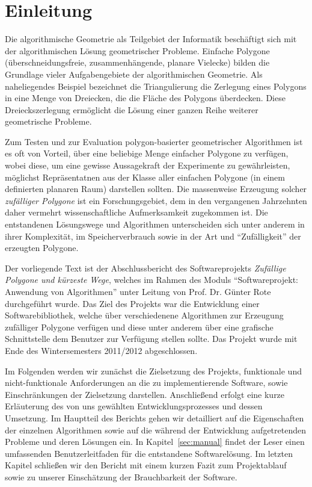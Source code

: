 \section{Einleitung}

  Die algorithmische Geometrie als Teilgebiet der Informatik beschäftigt sich
  mit der algorithmischen Lösung geometrischer Probleme. Einfache Polygone
  (überschneidungsfreie, zusammenhängende, planare Vielecke) bilden die
  Grundlage vieler Aufgabengebiete der algorithmischen Geometrie. Als
  naheliegendes Beispiel bezeichnet die Triangulierung die Zerlegung eines
  Polygons in eine Menge von Dreiecken, die die Fläche des Polygons
  überdecken. Diese Dreieckszerlegung ermöglicht die Lösung einer ganzen Reihe
  weiterer geometrische Probleme.

  Zum Testen und zur Evaluation polygon-basierter geometrischer
  Algorithmen ist es oft von Vorteil, über eine beliebige Menge einfacher
  Polygone zu verfügen, wobei diese, um eine gewisse Aussagekraft der
  Experimente zu gewährleisten, möglichst Repräsentatnen aus der Klasse aller
  einfachen Polygone (in einem definierten planaren Raum) darstellen sollten. 
  Die massenweise Erzeugung solcher \emph{zufälliger Polygone} ist ein
  Forschungsgebiet, dem in den vergangenen Jahrzehnten daher vermehrt
  wissenschaftliche Aufmerksamkeit zugekommen ist. Die entstandenen
  Lösungswege und Algorithmen unterscheiden sich unter anderem in ihrer
  Komplexität, im Speicherverbrauch sowie in der Art und
  \enquote{Zufälligkeit} der erzeugten Polygone.

  Der vorliegende Text ist der Abschlussbericht des Softwareprojekts
  \emph{Zufällige Polygone und kürzeste Wege}, welches im Rahmen des Moduls
  \enquote{Softwareprojekt: Anwendung von Algorithmen} unter Leitung von Prof.
  Dr. Günter Rote durchgeführt wurde. Das Ziel des Projekts war die
  Entwicklung einer Softwarebibliothek, welche über verschiedenene Algorithmen
  zur Erzeugung zufälliger Polygone verfügen und diese unter anderem
  über eine grafische Schnittstelle dem Benutzer zur Verfügung stellen sollte.
  Das Projekt wurde mit Ende des Wintersemesters 2011/2012 abgeschlossen.

  Im Folgenden werden wir zunächst die Zielsetzung des Projekts, funktionale
  und nicht-funktionale Anforderungen an die zu implementierende Software,
  sowie Einschränkungen der Zielsetzung darstellen. Anschließend erfolgt eine
  kurze Erläuterung des von uns gewählten Entwicklungsprozesses und dessen
  Umsetzung. Im Hauptteil des Berichts gehen wir detailliert auf die
  Eigenschaften der einzelnen Algorithmen sowie auf die während der
  Entwicklung aufgetretenden Probleme und deren Lösungen ein. In
  Kapitel~\ref{sec:manual} findet der Leser einen umfassenden
  Benutzerleitfaden für die entstandene Softwarelösung. Im letzten
  Kapitel schließen wir den Bericht mit einem kurzen Fazit zum Projektablauf
  sowie zu unserer Einschätzung der Brauchbarkeit der Software.

